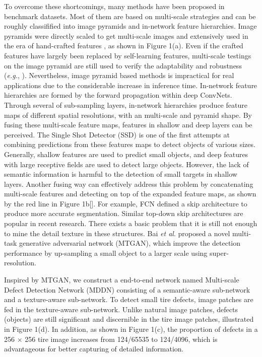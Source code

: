 \documentclass{article}
\begin{document}
To overcome these shortcomings, many methods have been proposed in benchmark datasets. Most of them are based on multi-scale strategies and can be roughly classifified into image pyramids and in-network feature hierarchies. Image pyramids were directly scaled to get multi-scale images and extensively used in the era of hand-crafted features \cite{lowe2004distinctive,dalal2005histograms}, as shown in Figure 1(a). Even if the crafted features have largely been replaced by self-learning features, multi-scale testings on the image pyramid are still used to verify the adaptability and robustness ({\it e.g.}, \cite{he2016deep}). Nevertheless, image pyramid based methods is impractical for real applications due to the considerable increase in inference time. In-network feature hierarchies are formed by the forward propagation within deep ConvNets. Through several of sub-sampling layers, in-network hierarchies produce feature maps of different spatial resolutions, with an multi-scale and pyramid shape\cite{lin2017feature}. By fusing these multi-scale feature maps, features in shallow and deep layers can be perceived. The Single Shot Detector (SSD) \cite{liu2016ssd} is one of the first attempts at combining predictions from these features maps to detect objects of various sizes. Generally, shallow features are used to predict small objects, and deep features with large receptive fields are used to detect large objects. However, the lack of semantic information is harmful to the detection of small targets in shallow layers. Another fusing way can effectively address this problem by concatenating multi-scale features and detecting on top of the expanded feature maps, as shown by the red line in Figure 1b[]. For example, FCN defined a skip architecture to produce more accurate segmentation. Similar top-down skip architectures are popular in recent research\cite{newell2016stacked,ghiasi2016laplacian}. There exists a basic problem that it is still not enough to mine the detail texture in these structures\cite{zhou2018scale}. Bai {\it et al}. proposed a novel multi-task generative adversarial network (MTGAN), which improve the detection performance by up-sampling a small object to a larger scale using super-resolution.

Inspired by MTGAN, we construct a end-to-end network named Multi-scale Defect Detection Network (MDDN) consisting of a semantic-aware sub-network and a texture-aware sub-network.
To detect small tire defects, image patches \cite{bai2018sod,chen2016attention} are fed in the texture-aware sub-network. Unlike natural image patches, defects (objects) are still significant and discernible in the tire image patches, illustrated in Figure 1(d). In addition, as shown in Figure 1(c), the proportion of defects in a 256 $\times$ 256 tire image increases from 124/65535 to 124/4096, which is advantageous for better capturing of detailed information.
\end{document}

